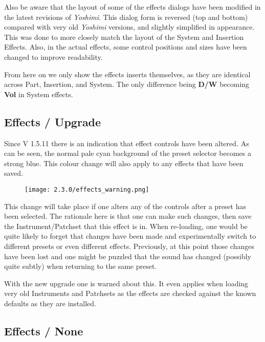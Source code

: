   Also be aware that the layout of some of the effects dialogs have been modified
   in the latest revisions of \textsl{Yoshimi}.
   This dialog form is reversed (top and bottom) compared with very old
   \textsl{Yoshimi} versions, and slightly simplified in appearance. This was done to
   more closely match the layout of the System and Insertion Effects.
   Also, in the actual effects, some control positions and sizes have been changed
   to improve readability.

   From here on we only show the effects inserts themselves, as they are identical
   across Part, Insertion, and System. The only difference being \textbf{D/W} becoming
   \textbf{Vol} in System effects.

\subsection{Effects / Upgrade}
\label{subsec:effects_upgrade}
   Since V 1.5.11 there is an indication that effect controls have been altered. As can
   be seen, the normal pale cyan background of the preset selector becomes a strong blue.
   This colour change will also apply to any effects that have been saved.
   \begin{figure}[H]
   \centering
   \texttt{[image: 2.3.0/effects\_warning.png]}
   \label{fig:effects_warning}
\end{figure}

   This change will take place if one alters any of the controls after a preset has been
   selected. The rationale here is that one can make such changes, then save the
   Instrument/Patchset that this effect is in.
   When re-loading, one would be quite likely to forget that changes have been made and
   experimentally switch to different presets or even different effects.
   Previously, at this point those changes have been lost and one might be puzzled that
   the sound has changed (possibly quite subtly) when returning to the same preset.

   With the new upgrade one is warned about this. It even applies when loading very old
   Instruments and Patchsets as the effects are checked against the known defaults as
   they are installed.

\subsection{Effects / None}
\label{subsec:effects_edit_none}

